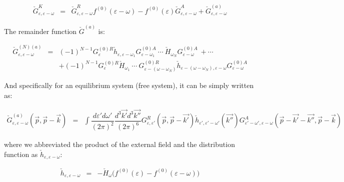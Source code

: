 \documentclass[uplatex,a4j,12pt,dvipdfmx]{jsarticle}
\begin{document}
\begin{eqnarray}
	\check{G}^{K}_{\varepsilon , \varepsilon - \omega}
	&=&
	\check{G}^{R}_{\varepsilon , \varepsilon - \omega}
	f^{(0)}(\varepsilon - \omega)
	-
	f^{(0)}(\varepsilon)
	\check{G}^{A}_{\varepsilon , \varepsilon - \omega}
	+
	\check{G}^{(a)}_{\varepsilon , \varepsilon - \omega}
\end{eqnarray}

The remainder function $\check{G}^{(a)}$ is:

\begin{eqnarray}
	\check{G}^{(N)(a)}_{\varepsilon , \varepsilon - \omega}
	&=&
	(-1)^{N-1}
	G^{(0)R}_{\varepsilon}
	\check{h}_{\varepsilon , \varepsilon - \omega_{1}}
	G^{(0)A}_{\varepsilon - \omega_{1}}
	\ \cdots \
	\check{H}_{\omega_{N}}
	G^{(0)A}_{\varepsilon - \omega}
	\ + \cdots
	\nonumber \\ && +
	(-1)^{N-1}
	G^{(0)R}_{\varepsilon}
	\check{H}_{\omega_{1}}
	\ \cdots \
	G^{(0)R}_{\varepsilon - ( \omega - \omega_{N} )}
	\check{h}_{\varepsilon - ( \omega - \omega_{N} ) , \varepsilon - \omega}
	G^{(0)A}_{\varepsilon - \omega}
\end{eqnarray}

And specifically for an equilibrium system (free system), it can be simply written as:

\begin{eqnarray}
	\check{G}^{(a)}_{\varepsilon , \varepsilon - \omega} ( \vec{p} , \vec{p} - \vec{k})
	&=&
	\int \!\! \dfrac{d \varepsilon'  d \omega' }{ (2 \pi)^{2} } \dfrac{d^{3} \vec{k'}  d^{3} \vec{k''} }{ (2 \pi)^{6} }
	G^{R}_{\varepsilon , \varepsilon'} (\vec{p} , \vec{p} - \vec{k'})
	\check{h}_{\varepsilon' , \varepsilon' - \omega'} (\vec{k''})
	G^{A}_{\varepsilon' - \omega' , \varepsilon - \omega} (\vec{p} - \vec{k'} - \vec{k''} , \vec{p} - \vec{k} )
\end{eqnarray}

where we abbreviated the product of the external field and the distribution function as $\check{h}_{\varepsilon , \varepsilon - \omega}$:

\begin{eqnarray}
	\check{h}_{\varepsilon , \varepsilon - \omega}
	&=&
	- \check{H}_{\omega} \Big( f^{(0)}(\varepsilon) - f^{(0)}(\varepsilon - \omega) \Big)
\end{eqnarray}










${}$
\end{document}
